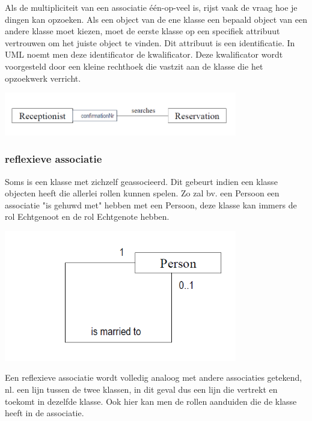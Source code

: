 Als de multipliciteit van een associatie één-op-veel is, rijst vaak de vraag hoe je dingen kan opzoeken. Als een object van de ene klasse een bepaald object van een andere klasse moet kiezen, moet de eerste klasse op een specifiek attribuut vertrouwen om het juiste object te vinden. Dit attribuut is een identificatie.
In UML noemt men deze identificator de kwalificator. Deze kwalificator wordt voorgesteld door een kleine rechthoek die vastzit aan de klasse die het opzoekwerk verricht.


\begin{center}
\includegraphics[width=4in]{img/qa1}%
\end{center}

\subsubsection{reflexieve associatie}

Soms is een klasse met zichzelf geassocieerd. Dit gebeurt indien een klasse objecten heeft die allerlei rollen kunnen spelen. Zo zal bv. een Persoon een associatie "is gehuwd met" hebben met een Persoon, deze klasse kan immers de rol Echtgenoot en de rol Echtgenote hebben.


\begin{center}
\includegraphics[width=4in]{img/ra1}%
\end{center}

Een reflexieve associatie wordt volledig analoog met andere associaties getekend, nl. een lijn tussen de twee klassen, in dit geval dus een lijn die vertrekt en toekomt in dezelfde klasse. Ook hier kan men de rollen aanduiden die de klasse heeft in de associatie.

